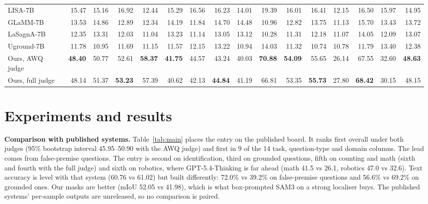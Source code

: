 \documentclass{article}
\newcommand{\ours}{\rowcolor{oursbg}}
\begin{document}
\begin{table}[t]
\begin{tabular}{@{}lrrrrrrrrrrrrrrr@{}}
LISA-7B & 15.47 & 15.16 & 16.92 & 12.44 & 15.29 & 16.56 & 16.23 & 14.01 & 19.39 & 16.01 & 16.41 & 12.15 & 16.50 & 15.97 & 14.95 \\
GLaMM-7B & 13.53 & 14.86 & 12.89 & 12.34 & 14.19 & 11.84 & 14.70 & 14.48 & 10.96 & 12.82 & 13.75 & 11.13 & 15.70 & 13.43 & 13.72 \\
LaSagnA-7B & 12.35 & 13.31 & 12.03 & 11.04 & 13.23 & 11.14 & 13.05 & 13.12 & 10.28 & 11.31 & 12.18 & 11.07 & 14.05 & 12.09 & 13.07 \\
Uground-7B & 11.78 & 10.95 & 11.69 & 11.15 & 11.57 & 12.15 & 13.22 & 10.94 & 14.03 & 11.32 & 10.74 & 10.78 & 11.79 & 13.40 & 12.38 \\
\midrule
\ours Ours, AWQ judge & \textbf{48.40} & 50.77 & 52.61 & \textbf{58.37} & \textbf{41.75} & 44.57 & 43.24 & 40.03 & \textbf{70.88} & \textbf{54.09} & 55.65 & 26.14 & 67.55 & 32.60 & \textbf{48.63} \\
\ours Ours, full judge & 48.14 & 51.37 & \textbf{53.23} & 57.39 & 40.62 & 42.13 & \textbf{44.84} & 41.19 & 66.81 & 53.35 & \textbf{55.73} & 27.80 & \textbf{68.42} & 30.15 & 48.15 \\
\bottomrule
\end{tabular}
\end{table}

\section{Experiments and results}\label{sec:results}
\textbf{Comparison with published systems.} Table~\ref{tab:main} places the entry on the published board. It ranks first overall under both judges (95\% bootstrap
interval 45.95--50.90 with the AWQ judge) and first in 9 of the 14 task, question-type and domain columns. The lead comes from
false-premise questions. The entry is second on identification, third on grounded questions, fifth on counting and math (sixth
and fourth with the full judge) and sixth on robotics, where GPT-5.4-Thinking is far ahead (math 41.5 vs 26.1, robotics 47.0 vs
32.6). Text accuracy is level with that system (60.76 vs 61.02) but built differently: 72.0\% vs 39.2\% on false-premise
questions and 56.6\% vs 69.2\% on grounded ones. Our masks are better (mIoU 52.05 vs 41.98), which is what box-prompted SAM3 on a
strong localiser buys. The published systems' per-sample outputs are unreleased, so no comparison is paired.
\end{document}
